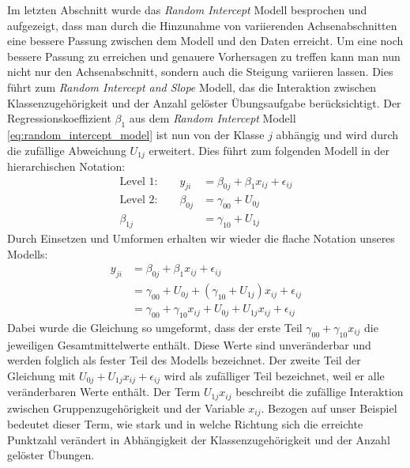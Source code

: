 \documentclass[12pt]{article}\usepackage[]{graphicx}\usepackage[]{color}
\begin{document}
Im letzten Abschnitt wurde das \textit{Random Intercept} Modell besprochen und aufgezeigt, dass man durch die Hinzunahme von variierenden Achsenabschnitten eine bessere Passung zwischen dem Modell und den Daten erreicht. Um eine noch bessere Passung zu erreichen und genauere Vorhersagen zu treffen kann man nun nicht nur den Achsenabschnitt, sondern auch die Steigung variieren lassen. Dies führt zum \textit{Random Intercept and Slope} Modell, das die Interaktion zwischen Klassenzugehörigkeit und der Anzahl gelöster Übungsaufgabe berücksichtigt. Der Regressionskoeffizient $\beta_{1}$ aus dem \textit{Random Intercept} Modell \eqref{eq:random_intercept_model} ist nun von der Klasse $j$ abhängig und wird durch die zufällige Abweichung $U_{1j}$ erweitert. Dies führt zum folgenden Modell in der hierarchischen Notation:
\begin{equation} \label{eq:random_intercept_slope_model}
\begin{split}	
 \text{Level 1:}  \qquad y_{ji} & = \beta_{0j} + \beta_{1}x_{ij} + \epsilon_{ij}\\
 \text{Level 2:} \qquad \beta_{0j} & = \gamma_{00} + U_{0j}\\
 \beta_{1j} & = \gamma_{10} + U_{1j}
\end{split}	
\end{equation} 
Durch Einsetzen und Umformen erhalten wir wieder die flache Notation unseres Modells:
\begin{equation} \label{eq:flat_random_intercept_slope_model}
\begin{split}	
y_{ji} & = \beta_{0j} + \beta_{1}x_{ij} + \epsilon_{ij}\\
& = \gamma_{00} + U_{0j} + (\gamma_{10} + U_{1j})x_{ij} + \epsilon_{ij}\\
& = \gamma_{00} + \gamma_{10}x_{ij} + U_{0j} + U_{1j}x_{ij} + \epsilon_{ij}
\end{split}	
\end{equation} 
Dabei wurde die Gleichung so umgeformt, dass der erste Teil $\gamma_{00} + \gamma_{10}x_{ij}$ die jeweiligen Gesamtmittelwerte enthält. Diese Werte sind unveränderbar und werden folglich als fester Teil des Modells bezeichnet. Der zweite Teil der Gleichung mit $U_{0j} + U_{1j}x_{ij} + \epsilon_{ij}$ wird als zufälliger Teil bezeichnet, weil er alle veränderbaren Werte enthält. Der Term $U_{1j}x_{ij}$ beschreibt die zufällige Interaktion zwischen Gruppenzugehörigkeit und der Variable $x_{ij}$. Bezogen auf unser Beispiel bedeutet dieser Term, wie stark und in welche Richtung sich die erreichte Punktzahl verändert in Abhängigkeit der Klassenzugehörigkeit und der Anzahl gelöster Übungen. 
\end{document}
